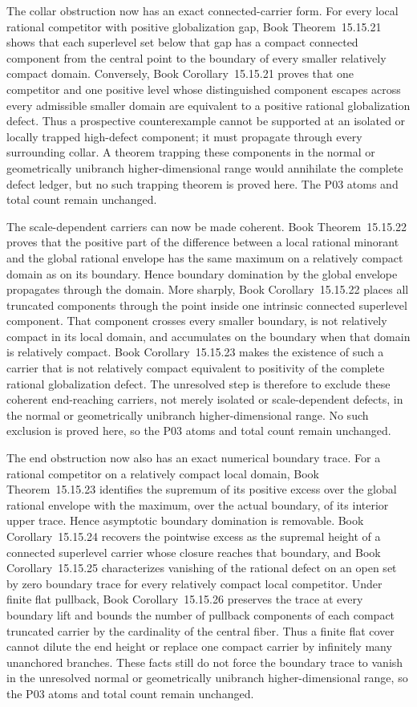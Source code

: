 \documentclass[11pt,a4paper]{article}
\theoremstyle{definition}
\theoremstyle{remark}
\begin{document}
The collar obstruction now has an exact connected-carrier form.
For every local rational competitor with positive globalization gap,
Book Theorem~15.15.21 shows that each superlevel set below
that gap has a compact connected component from the central point to the
boundary of every smaller relatively compact domain.  Conversely,
Book Corollary~15.15.21 proves that one
competitor and one positive level whose distinguished component escapes
across every admissible smaller domain are equivalent to a positive rational
globalization defect.  Thus a prospective counterexample
cannot be supported at an isolated or locally trapped high-defect component;
it must propagate through every surrounding collar.  A theorem trapping
these components in the normal or geometrically unibranch
higher-dimensional range would annihilate the complete defect ledger, but no
such trapping theorem is proved here.  The P03 atoms and total count remain
unchanged.

The scale-dependent carriers can now be made coherent.
Book Theorem~15.15.22 proves that the positive
part of the difference between a local rational minorant and the global
rational envelope has the same maximum on a relatively compact domain as on
its boundary.  Hence boundary domination by the global envelope propagates
through the domain.  More sharply,
Book Corollary~15.15.22 places all truncated
components through the point inside one intrinsic connected superlevel
component.  That component crosses every smaller boundary, is not relatively
compact in its local domain, and accumulates on the boundary when that domain
is relatively compact.
Book Corollary~15.15.23 makes the existence of
such a carrier that is not relatively compact equivalent to positivity of the
complete rational globalization defect.  The unresolved step is therefore
to exclude these coherent end-reaching carriers, not merely isolated or
scale-dependent defects, in the normal or geometrically unibranch
higher-dimensional range.  No such exclusion is proved here, so the P03
atoms and total count remain unchanged.

The end obstruction now also has an exact numerical boundary trace.
For a rational competitor on a relatively compact local domain,
Book Theorem~15.15.23 identifies the supremum of
its positive excess over the global rational envelope with the maximum,
over the actual boundary, of its interior upper trace.  Hence asymptotic
boundary domination is removable.
Book Corollary~15.15.24 recovers the pointwise excess as
the supremal height of a connected superlevel carrier whose closure reaches
that boundary, and
Book Corollary~15.15.25 characterizes
vanishing of the rational defect on an open set by zero boundary trace for
every relatively compact local competitor.  Under finite flat pullback,
Book Corollary~15.15.26 preserves the
trace at every boundary lift and bounds the number of pullback components of
each compact truncated carrier by the cardinality of the central fiber.
Thus a finite flat cover cannot dilute the end height or replace one compact
carrier by infinitely many unanchored branches.  These facts still do not
force the boundary trace to vanish in the unresolved normal or geometrically
unibranch higher-dimensional range, so the P03 atoms and total count remain
unchanged.
\end{document}
